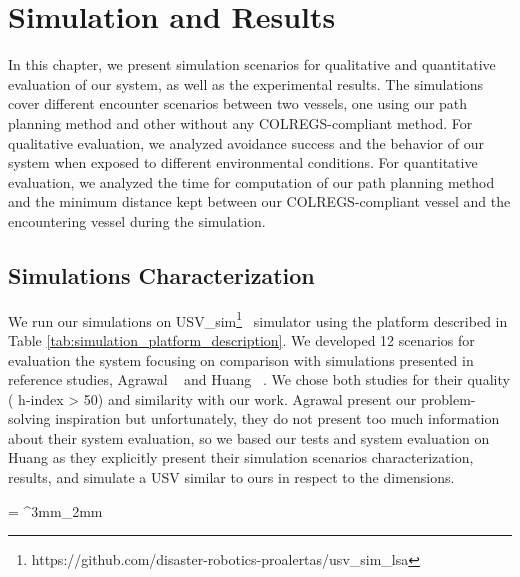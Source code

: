 \chapter{Simulation and Results}
\label{chap:5_Simulation_And_Results}
        
    In this chapter, we present simulation scenarios for qualitative and quantitative evaluation of our system, as well as the experimental results. The simulations cover different encounter scenarios between two vessels, one using our path planning method and other without any COLREGS-compliant method. For qualitative evaluation, we analyzed avoidance success and the behavior of our system when exposed to different environmental conditions. For quantitative evaluation, we analyzed the time for computation of our path planning method and the minimum distance kept between our COLREGS-compliant vessel and the encountering vessel during the simulation.

    \section{Simulations Characterization}

    We run our simulations on USV\_sim\footnote{https://github.com/disaster-robotics-proalertas/usv\_sim\_lsa}~\cite{Paravisi2018Toward} simulator using the platform described in Table \ref{tab:simulation_platform_description}. 
    We developed 12 scenarios for evaluation the system focusing on comparison with simulations presented in reference studies, \ie{} Agrawal \etal{} ~\cite{Agrawal2015COLREGS} and Huang \etal{} ~\cite{Huang2019Generalized}. We chose both studies for their quality (\ie{} h-index > 50) and similarity with our work. Agrawal \etal{} present our problem-solving inspiration but unfortunately, they do not present too much information about their system evaluation, so we based our tests and system evaluation on Huang \etal{} as they explicitly present their simulation scenarios characterization, results, and simulate a \ac{USV} similar to ours in respect to the dimensions.
    
    \tabulinesep = ^3mm_2mm
    \everyrow{\tabucline[.4mm  white]{}}

